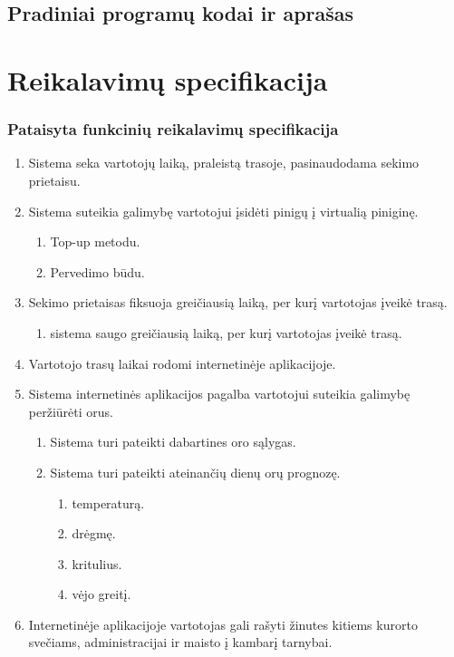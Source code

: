 \documentclass[oneside]{VUMIFPSkursinis}
\begin{document}
	\subsection{Pradiniai programų kodai ir aprašas}

\section{Reikalavimų specifikacija}

\subsubsection{Pataisyta funkcinių reikalavimų specifikacija}
\begin{enumerate}
	\item Sistema seka vartotojų laiką, praleistą trasoje, pasinaudodama sekimo prietaisu.
	\item Sistema suteikia galimybę vartotojui įsidėti pinigų į virtualią piniginę.
	\begin{enumerate}
		\item Top-up metodu.
		\item Pervedimo būdu.
	\end{enumerate}
	\item Sekimo prietaisas fiksuoja greičiausią laiką, per kurį vartotojas įveikė trasą.
	\begin{enumerate}
		\item sistema saugo greičiausią laiką, per kurį vartotojas įveikė trasą.
	\end{enumerate}
	\item Vartotojo trasų laikai rodomi internetinėje aplikacijoje.
	\item Sistema internetinės aplikacijos pagalba vartotojui suteikia galimybę peržiūrėti orus.
	\begin{enumerate}
		\item Sistema turi pateikti dabartines oro sąlygas.
		\item Sistema turi pateikti ateinančių dienų orų prognozę.
		\begin{enumerate}
			\item temperaturą.
			\item drėgmę.
			\item kritulius.
			\item vėjo greitį.
		\end{enumerate}
	\end{enumerate}
	\item Internetinėje aplikacijoje vartotojas gali rašyti žinutes kitiems kurorto svečiams, administracijai ir maisto į kambarį tarnybai.

\end{enumerate}
\end{document}
